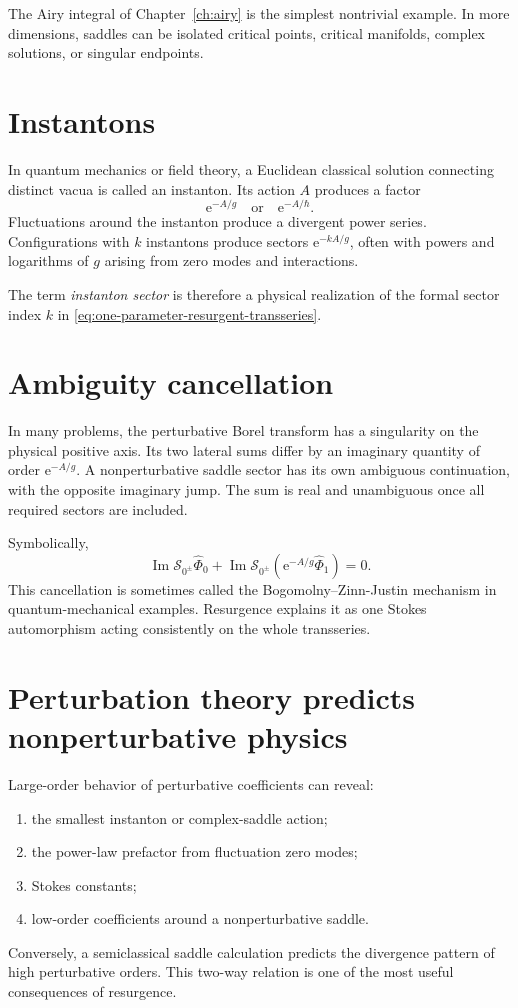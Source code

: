 \documentclass[11pt,oneside]{book}
\theoremstyle{definition}
\theoremstyle{remark}
\newcommand{\e}{\mathrm{e}}
\newcommand{\phihat}{\widehat{\Phi}}
\begin{document}
The Airy integral of Chapter~\ref{ch:airy} is the simplest nontrivial example.
In more dimensions, saddles can be isolated critical points, critical manifolds,
complex solutions, or singular endpoints.

\section{Instantons}

In quantum mechanics or field theory, a Euclidean classical solution connecting
distinct vacua is called an instanton. Its action $A$ produces a factor
\[
  \e^{-A/g}
  \quad\text{or}\quad
  \e^{-A/\hbar}.
\]
Fluctuations around the instanton produce a divergent power series. Configurations
with $k$ instantons produce sectors $\e^{-kA/g}$, often with powers and logarithms
of $g$ arising from zero modes and interactions.

The term \emph{instanton sector} is therefore a physical realization of the
formal sector index $k$ in \eqref{eq:one-parameter-resurgent-transseries}.

\section{Ambiguity cancellation}

In many problems, the perturbative Borel transform has a singularity on the
physical positive axis. Its two lateral sums differ by an imaginary quantity of
order $\e^{-A/g}$. A nonperturbative saddle sector has its own ambiguous
continuation, with the opposite imaginary jump. The sum is real and unambiguous
once all required sectors are included.

Symbolically,
\[
  \operatorname{Im}\mathcal S_{0^\pm}\phihat_0
  +\operatorname{Im}\mathcal S_{0^\pm}
     \left(\e^{-A/g}\phihat_1\right)=0.
\]
This cancellation is sometimes called the Bogomolny--Zinn-Justin mechanism in
quantum-mechanical examples. Resurgence explains it as one Stokes automorphism
acting consistently on the whole transseries.

\section{Perturbation theory predicts nonperturbative physics}

Large-order behavior of perturbative coefficients can reveal:
\begin{enumerate}
\item the smallest instanton or complex-saddle action;
\item the power-law prefactor from fluctuation zero modes;
\item Stokes constants;
\item low-order coefficients around a nonperturbative saddle.
\end{enumerate}
Conversely, a semiclassical saddle calculation predicts the divergence pattern
of high perturbative orders. This two-way relation is one of the most useful
consequences of resurgence.
\end{document}
